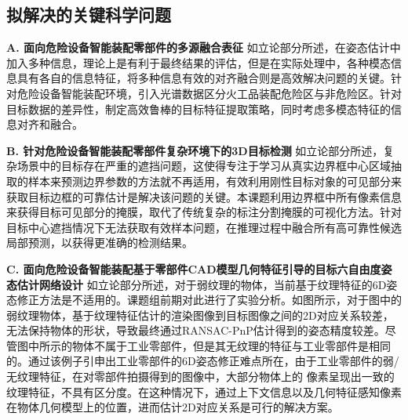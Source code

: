 \documentclass[12pt]{article}
\begin{document}



\subsection{拟解决的关键科学问题}

\textbf{A. 面向危险设备智能装配零部件的多源融合表征}
如立论部分所述，在姿态估计中加入多种信息，理论上是有利于最终结果的评估，但是在实际处理中，各种模态信息具有各自的信息特征，将多种信息有效的对齐融合则是高效解决问题的关键。针对危险设备智能装配环境，引入光谱数据区分火工品装配危险区与非危险区。针对目标数据的差异性，制定高效鲁棒的目标特征提取策略，同时考虑多模态特征的信息对齐和融合。

\textbf{B. 针对危险设备智能装配零部件复杂环境下的3D目标检测}
如立论部分所述，复杂场景中的目标存在严重的遮挡问题，这使得专注于学习从真实边界框中心区域抽取的样本来预测边界参数的方法就不再适用，有效利用刚性目标对象的可见部分来获取目标边框的可靠估计是解决该问题的关键。本课题利用边界框中所有像素信息来获得目标可见部分的掩膜，取代了传统复杂的标注分割掩膜的可视化方法。针对目标中心遮挡情况下无法获取有效样本问题，在推理过程中融合所有高可靠性候选局部预测，以获得更准确的检测结果。

\textbf{C. 面向危险设备智能装配基于零部件CAD模型几何特征引导的目标六自由度姿态估计网络设计}
如立论部分所述，对于弱纹理的物体，当前基于纹理特征的6D姿态修正方法是不适用的。课题组前期对此进行了实验分析。如图所示，对于图中的弱纹理物体，基于纹理特征估计的渲染图像到目标图像之间的2D对应关系较差，无法保持物体的形状，导致最终通过RANSAC-PnP估计得到的姿态精度较差。尽管图中所示的物体不属于工业零部件，但是其无纹理的特征与工业零部件是相同的。通过该例子引申出工业零部件的6D姿态修正难点所在，由于工业零部件的弱/无纹理特征，在对零部件拍摄得到的图像中，大部分物体上的 像素呈现出一致的纹理特征，不具有区分度。在这种情况下，通过上下文信息以及几何特征感知像素在物体几何模型上的位置，进而估计2D对应关系是可行的解决方案。
\end{document}

